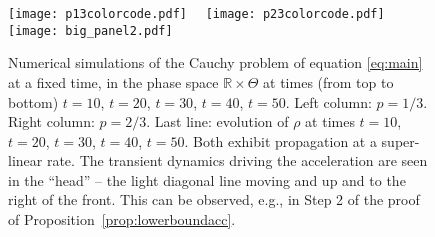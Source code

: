 \documentclass[11pt]{article}    %
\newcommand{\R}{\mathbb{R}}
\begin{document}
\begin{figure}[htbp]
\begin{center}
\texttt{[image: p13colorcode.pdf]}\qquad~~
\texttt{[image: p23colorcode.pdf]}
\texttt{[image: big\_panel2.pdf]}\\
\caption{Numerical simulations of the Cauchy problem of equation \eqref{eq:main} at a fixed time, in the phase space $\R\times\Theta$ at times (from top to bottom) $t=10$, $t=20$, $t=30$, $t=40$, $t=50$. Left column: $p=1/3$. Right column: $p=2/3$. Last line: evolution of $\rho$ at times $t=10$, $t=20$, $t=30$, $t=40$, $t=50$. Both exhibit  propagation at a super-linear rate.  The transient dynamics driving the acceleration are seen in the ``head'' -- the light diagonal line moving and up and to the right of the front.  This can be observed, e.g., in Step 2 of the proof of Proposition~\ref{prop:lowerboundacc}.}
\label{fig:Shape2}
\end{center}
\end{figure}
\end{document}
